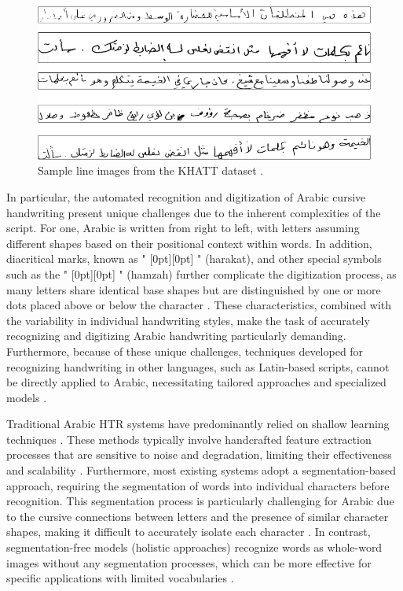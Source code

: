 \documentclass[conference]{IEEEtran}
\newcommand{\artext}[1]{%
  {\fontsize{8pt}{11pt}\selectfont \raisebox{0pt}[0pt][0pt]{\RL{#1}}}%
}
\begin{document}
\begin{figure}[t]
  \centering
  \includegraphics[width=0.9\linewidth]{Figs/fig1.png}
  \caption{Sample line images from the KHATT dataset \cite{mahmoud2014khatt}.}
  \label{fig:engagement_examples}
\end{figure}

In particular, the automated recognition and digitization of Arabic cursive handwriting present unique challenges due to the inherent complexities of the script. For one, Arabic is written from right to left, with letters assuming different shapes based on their positional context within words. In addition, diacritical marks, known as "\artext{حركات}" (harakat), and other special symbols such as the "\artext{همزة}" (hamzah) further complicate the digitization process, as many letters share identical base shapes but are distinguished by one or more dots placed above or below the character \cite{el1990arabic}. These characteristics, combined with the variability in individual handwriting styles, make the task of accurately recognizing and digitizing Arabic handwriting particularly demanding. Furthermore, because of these unique challenges, techniques developed for recognizing handwriting in other languages, such as Latin-based scripts, cannot be directly applied to Arabic, necessitating tailored approaches and specialized models \cite{alrobah2022arabic}.

Traditional Arabic HTR systems have predominantly relied on shallow learning techniques \cite{mutawa2024machine}. These methods typically involve handcrafted feature extraction processes that are sensitive to noise and degradation, limiting their effectiveness and scalability \cite{parvez2013offline}. Furthermore, most existing systems adopt a segmentation-based approach, requiring the segmentation of words into individual characters before recognition. This segmentation process is particularly challenging for Arabic due to the cursive connections between letters and the presence of similar character shapes, making it difficult to accurately isolate each character \cite{faizullah2023survey, mezghani2023recent}. In contrast, segmentation-free models (holistic approaches) recognize words as whole-word images without any segmentation processes, which can be more effective for specific applications with limited vocabularies \cite{alkhateeb2009component, nashwan2017holistic}.
\end{document}
